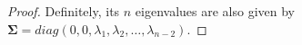 \begin{proof}
Definitely,  its   $n$  eigenvalues  are  also   given  by 
$
\mathbf \Sigma=
diag( 0, 0, \lambda_{1}, \lambda_{2},  \dots, \lambda_{n-2}) $.
%



\end{proof}
